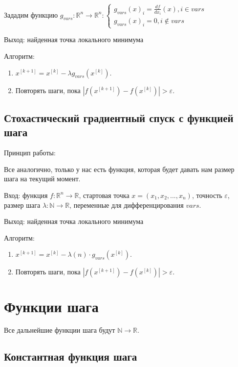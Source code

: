 \documentclass[a4paper,14pt,oneside,openany]{memoir}
\begin{document}
Зададим функцию $g_{vars}: \mathbb{R}^n \rightarrow \mathbb{R}^n: \begin{cases}
	g_{vars}(x)_i = \frac{df}{dx_i}(x), i \in vars \\
	g_{vars}(x)_i = 0, i \not \in vars
\end{cases}$

Выход: найденная точка локального минимума

Алгоритм:
\begin{enumerate}
	\item $x^{[k+1]} = x^{[k]} - \lambda g_{vars}(x^{[k]})$.
	\item Повторять шаги, пока  $|f(x^{[k+1]}) - f(x^{[k]})| > \varepsilon$.
\end{enumerate}

\subsection {Стохастический градиентный спуск с функцией шага}

Принцип работы: 

Все аналогично, только у нас есть функция, которая будет давать нам размер шага на текущий момент.

Вход: функция $f:\mathbb{R}^n \rightarrow \mathbb{R}$, стартовая точка $x = (x_1,x_2,...,x_n)$, точность $\varepsilon$, размер шага $\lambda: \mathbb{N} \rightarrow \mathbb{R}$, переменные для дифференцирования $vars$.

Выход: найденная точка локального минимума

Алгоритм:
\begin{enumerate}
	\item $x^{[k+1]} = x^{[k]} - \lambda(n) \cdot g_{vars}(x^{[k]})$.
	\item Повторять шаги, пока  $|f(x^{[k+1]}) - f(x^{[k]})| > \varepsilon$.
\end{enumerate}

\newpage

\section{Функции шага}

Все дальнейшие функции шага будут $\mathbb{N} \rightarrow \mathbb{R}$.

\subsection{Константная функция шага}
\end{document}
